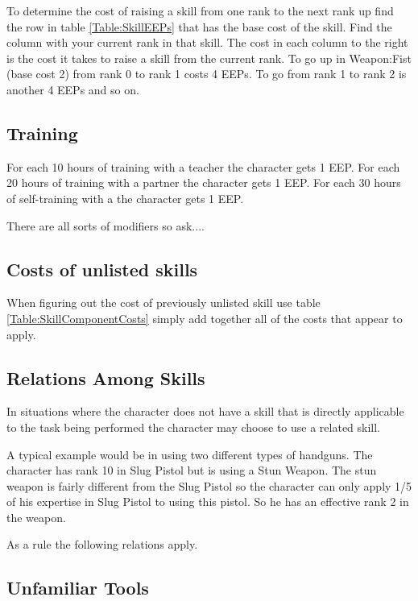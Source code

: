 

To determine the cost of raising a skill from one rank to the next rank
up find the row in table \ref{Table:SkillEEPs} that has the base cost of the skill.
Find the column with your current rank in that skill.
The cost in each column to the right is the cost it takes to raise a
skill from the current rank. To go up in Weapon:Fist (base cost 2) from
rank 0 to rank 1 costs 4 EEPs. To go from rank 1 to rank 2 is another 4
EEPs and so on.

\subsection{Training}

For each 10 hours of training with a teacher the character gets 1 EEP.
For each 20 hours of training with a partner the character gets 1 EEP.
For each 30 hours of self-training with a the character gets 1 EEP.

There are all sorts of modifiers so ask....

\subsection{Costs of unlisted skills}

When figuring out the cost of previously unlisted skill use table \ref{Table:SkillComponentCosts}
simply add together all of the  costs that appear to apply.

\subsection{Relations Among Skills}


In situations where the character does not have a skill that
is directly applicable to the task being performed the character 
may choose to use a related skill.

A typical example would be in using two different types of handguns. The
character has rank 10 in Slug Pistol but is using a Stun Weapon. The stun
weapon is fairly different from the Slug Pistol so the character can only
apply 1/5 of his expertise in Slug Pistol to using this pistol. So he has
an effective rank 2 in the weapon.

As a rule the following relations apply.



\subsection{Unfamiliar Tools}


